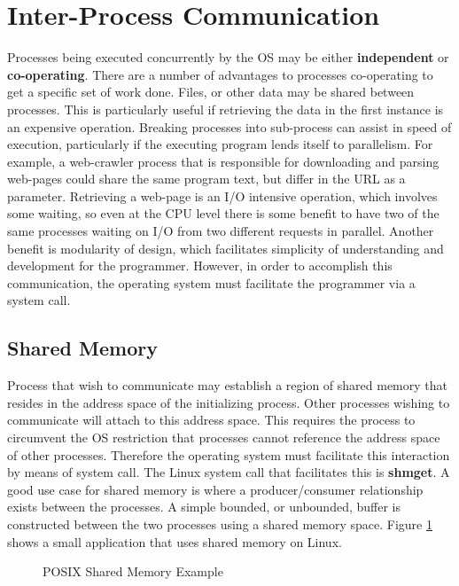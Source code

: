 \documentclass[10pt,a4paper]{article}
\begin{document}
\section{Inter-Process Communication}
Processes being executed concurrently by the OS may be either {\bf independent} or {\bf co-operating}. There are a number of advantages to processes co-operating to get a specific set of work done. Files, or other data may be shared between processes. This is particularly useful if retrieving the data in the first instance is an expensive operation. Breaking processes into sub-process can assist in speed of execution, particularly if the executing program lends itself to parallelism. For example, a web-crawler process that is responsible for downloading and parsing web-pages could share the same program text, but differ in the URL as a parameter. Retrieving a web-page is an I/O intensive operation, which involves some waiting, so even at the CPU level there is some benefit to have two of the same processes waiting on I/O from two different requests in parallel.  Another benefit is modularity of design, which facilitates simplicity of understanding and development for the programmer. However, in order to accomplish this communication, the operating system must facilitate the programmer via a system call. 
\subsection{Shared Memory}
Process that wish to communicate may establish a region of shared memory that resides in the address space of the initializing process. Other processes wishing to communicate will attach to this address space. This requires the process to circumvent the OS restriction that processes cannot reference the address space of other processes. Therefore the operating system must facilitate this interaction by means of system call. The Linux system call that facilitates this is {\bf shmget}. A good use case for shared memory is where a producer/consumer relationship exists between the processes. A simple bounded, or unbounded, buffer is constructed between the two processes using a shared memory space. Figure \ref{posix_sm} shows a small application that uses shared memory on Linux. 
\begin{figure}
\caption{POSIX Shared Memory Example \cite{OSCONCEPTS}}
\begin{center}

\label{posix_sm}
\end{center}
\end{figure}
\end{document}
